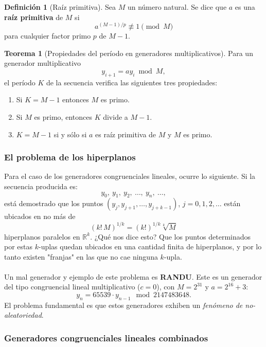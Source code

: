 \documentclass[11pt, a4paper]{article}
\theoremstyle{definition}
\newtheorem{definition}{Definición}
\newtheorem{theorem}{Teorema}
\begin{document}
\begin{definition}[Raíz primitiva]
    Sea $M$ un número natural. Se dice que $a$ es una \textbf{raíz primitiva} de $M$ si
    \[
    a^{(M-1)/p} \not\equiv 1 \pmod{M}
    \]
    para cualquier factor primo $p$ de $M-1$.
    \end{definition}
    
    \begin{theorem}[Propiedades del período en generadores multiplicativos]
    Para un generador multiplicativo
    \[
    y_{i+1} = a y_{i} \bmod M,
    \]
    el período $K$ de la secuencia verifica las siguientes tres propiedades:
    \begin{enumerate}
        \item Si $K = M-1$ entonces $M$ es primo.
        
        \item Si $M$ es primo, entonces $K$ divide a $M-1$.
        
        \item $K = M-1$ si y sólo si $a$ es raíz primitiva de $M$ y $M$ es primo.
    \end{enumerate}
    \end{theorem}

\subsubsection{El problema de los hiperplanos}

Para el caso de los generadores congruenciales lineales, ocurre lo siguiente. Si la secuencia producida es:
\[
y_{0},\ y_{1},\ y_{2},\ \ldots,\ y_{n},\ \ldots,
\]
está demostrado que los puntos $(y_{j}, y_{j+1}, \ldots, y_{j+k-1})$, $j=0,1,2,\ldots$ están ubicados en no más de
\[
(k!\,M)^{1/k} = (k!)^{1/k} \sqrt[k]{M}
\]
hiperplanos paralelos en $\mathbb{R}^{k}$. 
¿Qué nos dice esto? Que los puntos determinados por estas $k$-uplas quedan ubicados en una cantidad finita de hiperplanos, y por lo tanto existen "franjas" 
en las que no cae ninguna $k$-upla. 
\\ \\
Un mal generador y ejemplo de este problema es \textbf{RANDU}. Este es un generador del tipo congruencial lineal multiplicativo ($c=0$), con $M=2^{31}$ y $a=2^{16}+3$:
\[
y_{n} = 65539 \cdot y_{n-1} \mod 2147483648.
\]
El problema fundamental es que estos generadores exhiben un \textit{fenómeno de no-aleatoriedad}.

\subsubsection{Generadores congruenciales lineales combinados}
\end{document}
